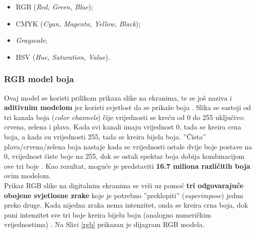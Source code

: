 \documentclass[12pt,a4paper]{article}
\begin{document}
\begin{itemize}

\item RGB (\textit{Red, Green, Blue});
\item CMYK (\textit{Cyan, Magenta, Yellow, Black});
\item \textit{Grayscale};
\item HSV (\textit{Hue, Saturation, Value}).

\end{itemize}

\subsubsection{RGB model boja}

Ovaj model se koristi prilikom prikaza slike na ekranima, te se još naziva i \textbf{aditivnim modelom} jer koristi svjetlost da se prikaže boja \cite{bels2}. Slika se sastoji od tri kanala boja (\textit{color channels}) čije vrijednosti se kreću od 0 do 255 uključivo: crvena, zelena i plava. Kada svi kanali imaju vrijednost 0, tada se kreira crna boja, a kada su vrijednosti 255, tada se kreira bijela boja. ''Čista'' plava/crvena/zelena boja nastaje kada se vrijednosti ostale dvije boje postave na 0, vrijednost čiste boje na 255, dok se ostali spektar boja dobija kombinacijom ove tri boje \cite{bels1}. Kao rezultat, moguće je predstaviti \textbf{16.7 miliona različitih boja} \cite{bels2} ovim modelom. \\

Prikaz RGB slike na digitalnim ekranima se vrši uz pomoć \textbf{tri odgovarajuće obojene svjetlosne zrake} koje je potrebno ''preklopiti'' (\textit{superimpose}) jednu preko druge. Kada nijedna zraka nema intenzitet, onda se kreira crna boja, dok puni intenzitet sve tri boje kreira bijelu boju (analogno numeričkim vrijednostima) \cite{bels2}. Na Slici \ref{rgb} prikazan je dijagram RGB modela.
\end{document}
